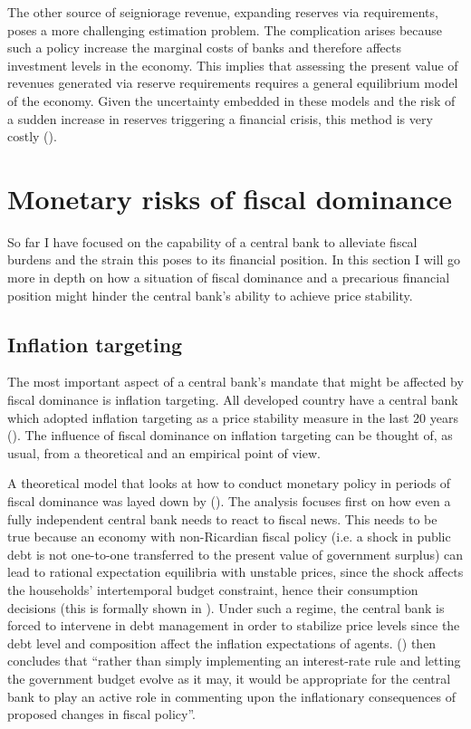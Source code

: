 \documentclass[american]{scrartcl}
\newcommand{\citein}[1]{\citeauthor{#1} (\citeyear{#1})}
\begin{document}
The other source of seigniorage revenue, expanding reserves via requirements, poses a more challenging estimation problem. The complication arises because such a policy increase the marginal costs of banks and therefore affects investment levels in the economy. This implies that assessing the present value of revenues generated via reserve requirements requires a general equilibrium model of the economy. Given the uncertainty embedded in these models and the risk of a sudden increase in reserves triggering a financial crisis, this method is very costly (\cite{Hoggarth2002}).

\section{Monetary risks of fiscal dominance}

So far I have focused on the capability of a central bank to alleviate fiscal burdens and the strain this poses to its financial position. In this section I will go more in depth on how a situation of fiscal dominance and a precarious financial position might hinder the central bank's ability to achieve price stability.

\subsection{Inflation targeting}

The most important aspect of a central bank's mandate that might be affected by fiscal dominance is inflation targeting. All developed country have a central bank which adopted inflation targeting as a price stability measure in the last 20 years (\cite{Ahmed2021}). The influence of fiscal dominance on inflation targeting can be thought of, as usual, from a theoretical and an empirical point of view.

A theoretical model that looks at how to conduct monetary policy in periods of fiscal dominance was layed down by \citein{Woodford1998}. The analysis focuses first on how even a fully independent central bank needs to react to fiscal news. This needs to be true because an economy with non-Ricardian fiscal policy (i.e. a shock in public debt is not one-to-one transferred to the present value of government surplus) can lead to rational expectation equilibria with unstable prices, since the shock affects the households' intertemporal budget constraint, hence their consumption decisions (this is formally shown in \cite[p. 123]{Woodford1998}). Under such a regime, the central bank is forced to intervene in debt management in order to stabilize price levels since the debt level and composition affect the inflation expectations of agents. \citein{Woodford1998} then concludes that “rather than simply implementing an interest-rate rule and letting the government budget evolve as it may, it would be appropriate for the central bank to play an active role in commenting upon the inflationary consequences of proposed changes in fiscal policy”.
\end{document}
